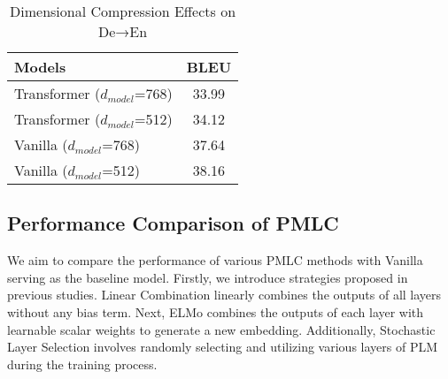 \documentclass[conference]{IEEEtran}
\begin{document}
\begin{table}[!tb]
    \centering
    \caption{Dimensional Compression Effects on De→En}
    \label{tab:1}
    \begin{tabular}{|l|c|}
        \hline
        \textbf{Models} & \textbf{BLEU} \\
        \hline
        Transformer ($d_{model}$=768) & 33.99 \\
        Transformer ($d_{model}$=512) & 34.12 \\
        Vanilla ($d_{model}$=768) & 37.64 \\
        Vanilla ($d_{model}$=512) & 38.16 \\
        \hline
    \end{tabular}
\end{table}



\subsection{Performance Comparison of PMLC}
We aim to compare the performance of various PMLC methods with Vanilla serving as the baseline model. Firstly, we introduce strategies proposed in previous studies. Linear Combination \cite{dou2018exploiting} linearly combines the outputs of all layers without any bias term. Next, ELMo \cite{edunov2019pretrained} combines the outputs of each layer with learnable scalar weights to generate a new embedding. Additionally, Stochastic Layer Selection \cite{xu2021bibert} involves randomly selecting and utilizing various layers of PLM during the training process.
\end{document}

